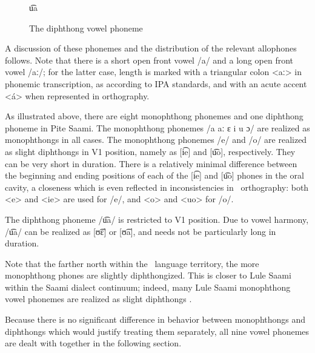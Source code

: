 \begin{figure}
\centering
u͡a %
\caption[Diphthong inventory]{The diphthong vowel phoneme} \label{diphthongs}
\end{figure}

A discussion of these phonemes and the distribution of the relevant allophones follows. 
Note that there is a short open front vowel /a/ and a long open front vowel /aː/; for the latter case, length is marked with a triangular colon <aː> in phonemic transcription, as according to IPA standards, and with an acute accent <á> when represented in orthography.

As illustrated above, there are eight monophthong phonemes %
and one diphthong phoneme in Pite Saami. The monophthong phonemes /a aː ɛ i u ɔ/ are realized as monophthongs in all cases. 
The monophthong phonemes /e/ and /o/ are realized as slight diphthongs in V1 position, namely as [i͡e] and [u͡o], %
respectively. They can be very short in duration. There is a relatively minimal difference between the beginning and ending positions of each of the [i͡e] and [u͡o] phones in the oral cavity, a closeness which is even reflected in inconsistencies in \PS\ orthography: both <e> and <ie> are used for /e/, and <o> and <uo> for /o/. 

The diphthong phoneme /u͡a/ is restricted to V1 position. Due to vowel harmony, /u͡a/ can be realized as [ʊ͡ɛ] or [ʊ͡a], and needs not be particularly long in duration. 

Note that the farther north within the \PS\ language territory, the more monophthong phones are slightly diphthongized. This is closer to Lule Saami within the Saami dialect continuum; indeed, many Lule Saami monophthong vowel phonemes are realized as slight diphthongs \citep[cf., e.g.,][11]{Spiik1989}. 

Because there is no significant difference in behavior between monophthongs and diphthongs which would justify treating them separately, all nine vowel phonemes are dealt with together in the following section.


